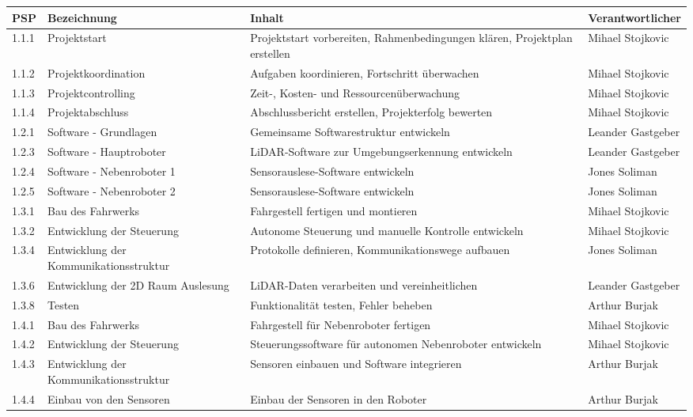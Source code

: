 \begin{longtable}[c]{|p{1cm}|p{5cm}|p{5cm}|l|}
\hline
\textbf{PSP} & \textbf{Bezeichnung} & \textbf{Inhalt} & \textbf{Verantwortlicher} \\
\hline
1.1.1 & Projektstart & Projektstart vorbereiten, Rahmenbedingungen klären, Projektplan erstellen & Mihael Stojkovic \\
\hline
1.1.2 & Projektkoordination & Aufgaben koordinieren, Fortschritt überwachen & Mihael Stojkovic \\
\hline
1.1.3 & Projektcontrolling & Zeit-, Kosten- und Ressourcenüberwachung & Mihael Stojkovic \\
\hline
1.1.4 & Projektabschluss & Abschlussbericht erstellen, Projekterfolg bewerten & Mihael Stojkovic \\
\hline
1.2.1 & Software - Grundlagen & Gemeinsame Softwarestruktur entwickeln & Leander Gastgeber \\
\hline
1.2.3 & Software - Hauptroboter & LiDAR-Software zur Umgebungserkennung entwickeln & Leander Gastgeber \\
\hline
1.2.4 & Software - Nebenroboter 1 & Sensorauslese-Software entwickeln & Jones Soliman \\
\hline
1.2.5 & Software - Nebenroboter 2 & Sensorauslese-Software entwickeln & Jones Soliman \\
\hline
1.3.1 & Bau des Fahrwerks & Fahrgestell fertigen und montieren & Mihael Stojkovic \\
\hline
1.3.2 & Entwicklung der Steuerung & Autonome Steuerung und manuelle Kontrolle entwickeln & Mihael Stojkovic \\
\hline
1.3.4 & Entwicklung der Kommunikationsstruktur & Protokolle definieren, Kommunikationswege aufbauen & Jones Soliman \\
\hline
1.3.6 & Entwicklung der 2D Raum Auslesung & LiDAR-Daten verarbeiten und vereinheitlichen & Leander Gastgeber \\
\hline
1.3.8 & Testen & Funktionalität testen, Fehler beheben & Arthur Burjak \\
\hline
1.4.1 & Bau des Fahrwerks & Fahrgestell für Nebenroboter fertigen & Mihael Stojkovic \\
\hline
1.4.2 & Entwicklung der Steuerung & Steuerungssoftware für autonomen Nebenroboter entwickeln & Mihael Stojkovic \\
\hline
1.4.3 & Entwicklung der Kommunikationsstruktur & Sensoren einbauen und Software integrieren & Arthur Burjak \\
\hline
1.4.4 & Einbau von den Sensoren & Einbau der Sensoren in den Roboter & Arthur Burjak \\

\end{longtable}
